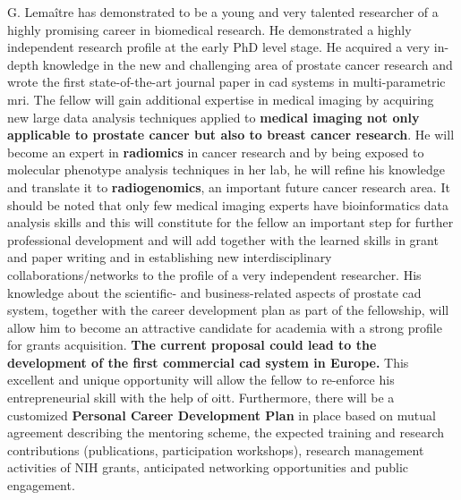 G. Lema\^itre has demonstrated to be a young and very talented researcher of a highly promising career in biomedical research.
He demonstrated a highly independent research profile at the early PhD level stage. 
He acquired a very in-depth knowledge in the new and challenging area of prostate cancer research and wrote the first state-of-the-art journal paper in \ac{cad} systems in multi-parametric \ac{mri}.
The fellow will gain additional expertise in medical imaging by acquiring new large data analysis techniques applied to \textbf{medical imaging not only applicable to prostate cancer but also to breast cancer research}.
He will become an expert in \textbf{radiomics} in cancer research and by being exposed to molecular phenotype analysis techniques in her lab, he will refine his knowledge and translate it to \textbf{radiogenomics}, an important future cancer research area.
It should be noted that only few medical imaging experts have bioinformatics data analysis skills and this will constitute for the fellow an important step for further professional development and will add together with the learned skills in grant and paper writing and in establishing new interdisciplinary collaborations/networks to the profile of a very independent researcher.
His knowledge about the scientific- and business-related aspects of prostate \ac{cad} system, together with the career development plan as part of the fellowship, will allow him to become an attractive candidate for academia with a strong profile for grants acquisition.
\textbf{The current proposal could lead to the development of the first commercial \ac{cad} system in Europe.}
This excellent and unique opportunity will allow the fellow to re-enforce his entrepreneurial skill with the help of \ac{oitt}.
Furthermore, there will be a customized \textbf{Personal Career Development Plan} in place based on mutual agreement describing the mentoring scheme, the expected training and research contributions (publications, participation workshops), research management activities of NIH grants, anticipated networking opportunities and public engagement.